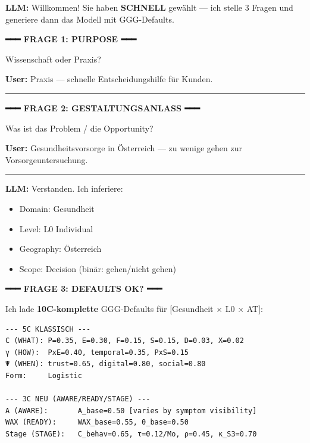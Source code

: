 \begin{tcolorbox}[colback=green!5!white, colframe=green!75!black,
    title=Example: SCHNELL Model Design (3 Questions), breakable]
\small
\textbf{LLM:} Willkommen! Sie haben \textbf{SCHNELL} gewählt --- ich stelle
3 Fragen und generiere dann das Modell mit GGG-Defaults.

\vspace{0.3em}
\textbf{━━━ FRAGE 1: PURPOSE ━━━}
\vspace{0.3em}

Wissenschaft oder Praxis?

\textbf{User:} Praxis --- schnelle Entscheidungshilfe für Kunden.

\hrule
\vspace{0.3em}

\textbf{━━━ FRAGE 2: GESTALTUNGSANLASS ━━━}
\vspace{0.3em}

Was ist das Problem / die Opportunity?

\textbf{User:} Gesundheitsvorsorge in Österreich --- zu wenige gehen zur
Vorsorgeuntersuchung.

\hrule
\vspace{0.3em}

\textbf{LLM:} Verstanden. Ich inferiere:
\begin{itemize}[nosep]
\item Domain: Gesundheit
\item Level: L0 Individual
\item Geography: Österreich
\item Scope: Decision (binär: gehen/nicht gehen)
\end{itemize}

\vspace{0.3em}
\textbf{━━━ FRAGE 3: DEFAULTS OK? ━━━}
\vspace{0.3em}

Ich lade \textbf{10C-komplette} GGG-Defaults für [Gesundheit × L0 × AT]:
\begin{verbatim}
--- 5C KLASSISCH ---
C (WHAT): P=0.35, E=0.30, F=0.15, S=0.15, D=0.03, X=0.02
γ (HOW):  PxE=0.40, temporal=0.35, PxS=0.15
Ψ (WHEN): trust=0.65, digital=0.80, social=0.80
Form:     Logistic

--- 3C NEU (AWARE/READY/STAGE) ---
A (AWARE):       A_base=0.50 [varies by symptom visibility]
WAX (READY):     WAX_base=0.55, θ_base=0.50
Stage (STAGE):   C_behav=0.65, τ=0.12/Mo, ρ=0.45, κ_S3=0.70
\end{verbatim}


\end{tcolorbox}
